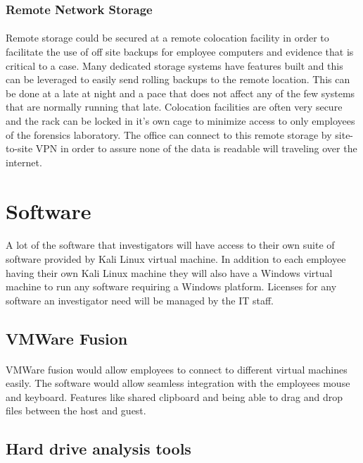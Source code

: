 \documentclass{article}
\begin{document}
\subsubsection{Remote Network Storage}
\paragraph{}
Remote storage could be secured at a remote colocation facility in order to facilitate the use of off site backups for employee computers and evidence that is critical to a case. 
Many dedicated storage systems have features built and this can be leveraged to easily send rolling backups to the remote location. 
This can be done at a late at night and a pace that does not affect any of the few systems that are normally running that late. 
Colocation facilities are often very secure and the rack can be locked in it's own cage to minimize access to only employees of the forensics laboratory. 
The office can connect to this remote storage by site-to-site VPN in order to assure none of the data is readable will traveling over the internet. 

\section{Software}
\paragraph{}
A lot of the software that investigators will have access to their own suite of software provided by Kali Linux virtual machine. In addition to each employee having their own Kali Linux machine they will also have a Windows virtual machine to run any software requiring a Windows platform. Licenses for any software an investigator need will be managed by the IT staff. 
\subsection{VMWare Fusion} 
\paragraph{}
VMWare fusion would allow employees to connect to different virtual machines easily.
The software would allow seamless integration with the employees mouse and keyboard. 
Features like shared clipboard and being able to drag and drop files between the host and guest.
\subsection{Hard drive analysis tools}
\end{document}
